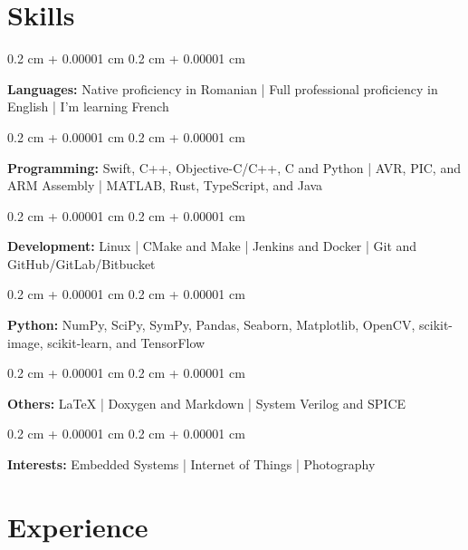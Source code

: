 \documentclass[10pt, a4paper]{article}
\newenvironment{onecolentry}{
    \begin{adjustwidth}{
        0.2 cm + 0.00001 cm
    }{
        0.2 cm + 0.00001 cm
    }
}{
    \end{adjustwidth}
} %
\begin{document}
    
    \section{Skills}



        
        \begin{onecolentry}
            \textbf{Languages:} Native proficiency in Romanian | Full professional proficiency in English | I'm learning French
        \end{onecolentry}

        \vspace{0.2 cm}

        \begin{onecolentry}
            \textbf{Programming:} Swift, C++, Objective-C/C++, C and Python | AVR, PIC, and ARM Assembly | MATLAB, Rust, TypeScript, and Java
        \end{onecolentry}

        \vspace{0.2 cm}

        \begin{onecolentry}
            \textbf{Development:} Linux | CMake and Make | Jenkins and Docker | Git and GitHub/GitLab/Bitbucket
        \end{onecolentry}

        \vspace{0.2 cm}

        \begin{onecolentry}
            \textbf{Python:} NumPy, SciPy, SymPy, Pandas, Seaborn, Matplotlib, OpenCV, scikit-image, scikit-learn, and TensorFlow
        \end{onecolentry}

        \vspace{0.2 cm}

        \begin{onecolentry}
            \textbf{Others:} LaTeX | Doxygen and Markdown | System Verilog and SPICE
        \end{onecolentry}

        \vspace{0.2 cm}

        \begin{onecolentry}
            \textbf{Interests:} Embedded Systems | Internet of Things | Photography
        \end{onecolentry}


    
    \section{Experience}
\end{document}
